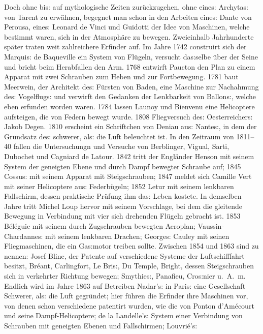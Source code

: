 \documentclass[oneside,12pt]{book}
\newcommand{\s}{s:}
\begin{document}
Doch ohne bi{\s} auf mythologische Zeiten zur\"uckzugehen, ohne
eine{\s} Archyta{\s} von Tarent zu erw\"ahnen, begegnet man schon in
den Arbeiten eine{\s} Dante von Perousa, eine{\s} Leonard de Vinci
und Guidotti der Idee von Maschinen, welche bestimmt waren, sich in
der Atmosph\"are zu bewegen. Zweieinhalb Jahrhunderte sp\"ater traten
weit zahlreichere Erfinder auf. Im Jahre 1742 construirt sich der
Marqui{\s} de Baqueville ein System von Fl\"ugeln, versucht
da{\s}selbe \"uber der Seine und bricht beim Herabfallen den Arm.
1768 entwirft Paucton den Plan zu einem Apparat mit zwei Schrauben
zum Heben und zur Fortbewegung. 1781 baut Meerwein, der Architekt
de{\s} F\"ursten von Baden, eine Maschine zur Nachahmung de{\s}
Vogelflug{\s} und verwirft den Gedanken der Lenkbarkeit von
Ballon{\s}, welche eben erfunden worden waren. 1784 lassen Launoy und
Bienvenu eine Helicoptere aufsteigen, die von Federn bewegt wurde.
1808 Fliegversuch de{\s} Oesterreicher{\s} Jakob Degen. 1810
erscheint ein Schriftchen von Deniau au{\s} Nante{\s}, in dem der
Grundsatz de{\s} {\glqq}schwerer, al{\s} die Luft{\grqq} beleuchtet
ist. In den Zeitraum von 1811--40 fallen die Untersuchungn und
Versuche von Berblinger, Vigual, Sarti, Dubochet und Cagniard de
Latour. 1842 tritt der Engl\"ander Henson mit seinem System der
geneigten Ebene und durch Dampf bewegter Schraube auf; 1845 Cossu{\s}
mit seinem Apparat mit Steigschrauben; 1847 meldet sich Camille Vert
mit seiner Helicoptere au{\s} Federb\"ugeln; 1852 Letur mit seinem
lenkbaren Fallschirm, dessen praktische Pr\"ufung ihm da{\s} Leben
kostete. In demselben Jahre tritt Michel Loup hervor mit seinem
Vorschlage, bei dem die gleitende Bewegung in Verbindung mit vier
sich drehenden Fl\"ugeln gebracht ist. 1853 B\'el\'eguic mit seinem
durch Zugschrauben bewegten Aeroplan; Vaussin-Chardanne{\s} mit
seinem lenkbaren Drachen; George{\s} Cauley mit seinen
Fliegmaschinen, die ein Ga{\s}motor treiben sollte. Zwischen 1854 und
1863 sind zu nennen: Josef Bline, der Patente auf verschiedene
Systeme der Luftschifffahrt besitzt, Br\'eant, Carlingfort, Le
Bri{\s}, Du Temple, Bright, dessen Steigschrauben sich in verkehrter
Richtung bewegen; Smythie{\s}, Panafieu, Cro{\s}nier u.~A.~m. Endlich
wird im Jahre 1863 auf Betreiben Nadar'{\s} in Pari{\s} eine
Gesellschaft {\glqq}Schwerer, al{\s} die Luft{\grqq} gegr\"undet;
hier f\"uhren die Erfinder ihre Maschinen vor, von denen schon
verschiedene patentirt wurden, wie die von Ponton d'Am\'ecourt und
seine Dampf-Helicoptere; de la Landelle'{\s} System einer Verbindung
von Schrauben mit geneigten Ebenen und Fallschirmen; Louvri\'e'{\s}
\end{document}
